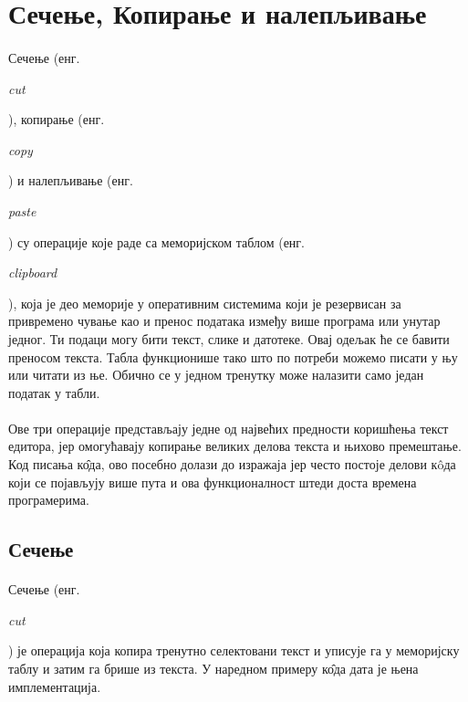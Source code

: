\documentclass[12pt,oneside]{memoir}
\begin{document}
\section{Сечење, Копирање и налепљивање}
\paragraph{}
Сечење (енг. \begin{latinica}\textit{cut}\end{latinica}), копирање
(енг. \begin{latinica}\textit{copy}\end{latinica}) и налепљивање
(енг. \begin{latinica}\textit{paste}\end{latinica}) су операције
које раде са меморијском таблом 
(енг. \begin{latinica}\textit{clipboard}\end{latinica}), која је део меморије
у оперативним системима који је резервисан за привремено чување као и пренос
података између више програма или унутар једног. Ти подаци могу бити текст,
слике и датотеке. Овај одељак ће се бавити преносом текста. Табла функционише
тако што по потреби можемо писати у њу или читати из ње. Обично се у једном
тренутку може налазити само један податак у табли.

\paragraph{}
Ове три операције представљају једне од највећих предности коришћења текст едитора,
јер омогућавају копирање великих делова текста и њихово премештање. Код писања к\^{о}да,
ово посебно долази до изражаја јер често постоје делови к\^{o}да који се појављују више пута и ова функционалност штеди доста времена програмерима.

\subsection{Сечење}
\paragraph{}
Сечење (енг. \begin{latinica}\textit{cut}\end{latinica}) је операција која
копира тренутно селектовани текст и уписује га у меморијску таблу и затим га
брише из текста. У наредном примеру к\^{о}да дата је њена имплементација.
\end{document}
